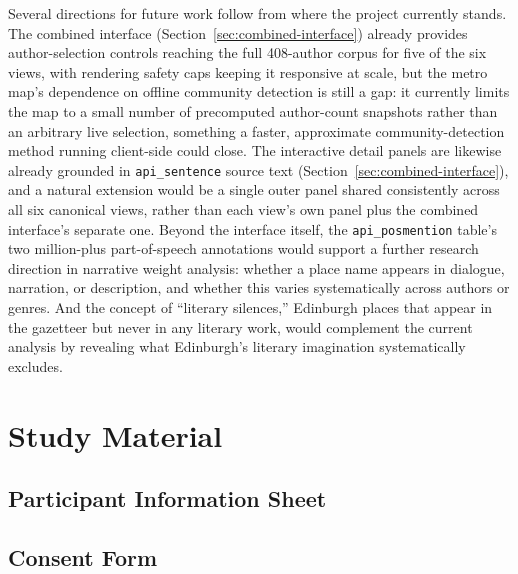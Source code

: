 \documentclass[logo,msc]{infthesis}
\begin{document}
Several directions for future work follow from where the project currently stands. The combined interface (Section~\ref{sec:combined-interface}) already provides author-selection controls reaching the full 408-author corpus for five of the six views, with rendering safety caps keeping it responsive at scale, but the metro map's dependence on offline community detection is still a gap: it currently limits the map to a small number of precomputed author-count snapshots rather than an arbitrary live selection, something a faster, approximate community-detection method running client-side could close. The interactive detail panels are likewise already grounded in \texttt{api\_sentence} source text (Section~\ref{sec:combined-interface}), and a natural extension would be a single outer panel shared consistently across all six canonical views, rather than each view's own panel plus the combined interface's separate one. Beyond the interface itself, the \texttt{api\_posmention} table's two million-plus part-of-speech annotations would support a further research direction in narrative weight analysis: whether a place name appears in dialogue, narration, or description, and whether this varies systematically across authors or genres. And the concept of ``literary silences,'' Edinburgh places that appear in the gazetteer but never in any literary work, would complement the current analysis by revealing what Edinburgh's literary imagination systematically excludes.
 
 


 
 
\appendix
 
\chapter{Study Material}
 
\section{Participant Information Sheet}


\section{Consent Form}

 
\end{document}
